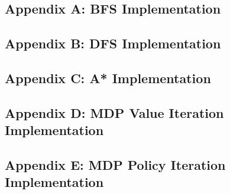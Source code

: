 \documentclass{article}
\begin{document}
\subsection*{Appendix A: BFS Implementation}


\subsection*{Appendix B: DFS Implementation}


\subsection*{Appendix C: A* Implementation}


\subsection*{Appendix D: MDP Value Iteration Implementation}


\subsection*{Appendix E: MDP Policy Iteration Implementation}

\end{document}
